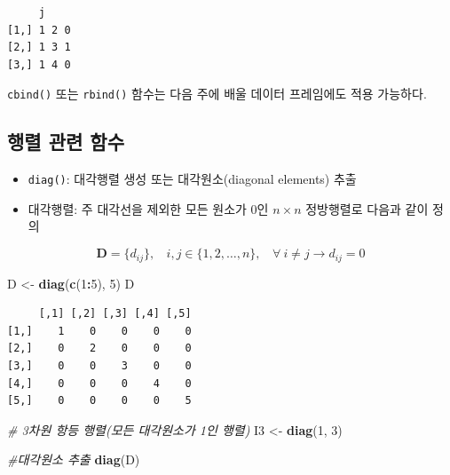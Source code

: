 \documentclass[
  11pt,
]{krantz}
\newenvironment{Shaded}{\begin{snugshade}}{\end{snugshade}}
\newcommand{\CommentTok}[1]{\textcolor[rgb]{0.37,0.37,0.37}{\textit{#1}}}
\newcommand{\DecValTok}[1]{\textcolor[rgb]{0.06,0.06,0.06}{#1}}
\newcommand{\KeywordTok}[1]{\textcolor[rgb]{0.27,0.27,0.27}{\textbf{#1}}}
\newcommand{\NormalTok}[1]{#1}
\newcommand{\OperatorTok}[1]{\textcolor[rgb]{0.43,0.43,0.43}{\textbf{#1}}}
\newcommand{\StringTok}[1]{\textcolor[rgb]{0.5,0.5,0.5}{#1}}
\providecommand{\tightlist}{%
  \setlength{\itemsep}{0pt}\setlength{\parskip}{0pt}}
\let\BeginKnitrBlock\begin \let\EndKnitrBlock\end
\begin{document}
\begin{verbatim}
     j    
[1,] 1 2 0
[2,] 1 3 1
[3,] 1 4 0
\end{verbatim}

\normalsize

\footnotesize

\BeginKnitrBlock{rmdnote}
\texttt{cbind()} 또는 \texttt{rbind()} 함수는 다음 주에 배울 데이터 프레임에도 적용 가능하다.
\EndKnitrBlock{rmdnote}

\normalsize

\hypertarget{uxd589uxb82c-uxad00uxb828-uxd568uxc218}{%
\subsection{행렬 관련 함수}\label{uxd589uxb82c-uxad00uxb828-uxd568uxc218}}

\begin{itemize}
\tightlist
\item
  \texttt{diag()}: 대각행렬 생성 또는 대각원소(diagonal elements) 추출
\item
  대각행렬: 주 대각선을 제외한 모든 원소가 0인 \(n\times n\) 정방행렬로 다음과 같이 정의
\end{itemize}

\[
 \mathrm{\mathbf{D}} = \{d_{ij}\},~~~~i, j \in \{1, 2, \ldots, n\},~~~~\forall~ i \neq j \rightarrow d_{ij} = 0
\]
\footnotesize

\begin{Shaded}
\begin{Highlighting}[]
\NormalTok{D <-}\StringTok{ }\KeywordTok{diag}\NormalTok{(}\KeywordTok{c}\NormalTok{(}\DecValTok{1}\OperatorTok{:}\DecValTok{5}\NormalTok{), }\DecValTok{5}\NormalTok{)}
\NormalTok{D}
\end{Highlighting}
\end{Shaded}

\begin{verbatim}
     [,1] [,2] [,3] [,4] [,5]
[1,]    1    0    0    0    0
[2,]    0    2    0    0    0
[3,]    0    0    3    0    0
[4,]    0    0    0    4    0
[5,]    0    0    0    0    5
\end{verbatim}

\begin{Shaded}
\begin{Highlighting}[]
\CommentTok{# 3차원 항등 행렬(모든 대각원소가 1인 행렬)}
\NormalTok{I3 <-}\StringTok{ }\KeywordTok{diag}\NormalTok{(}\DecValTok{1}\NormalTok{, }\DecValTok{3}\NormalTok{)}

\CommentTok{#대각원소 추출}
\KeywordTok{diag}\NormalTok{(D)}
\end{Highlighting}
\end{Shaded}
\end{document}
